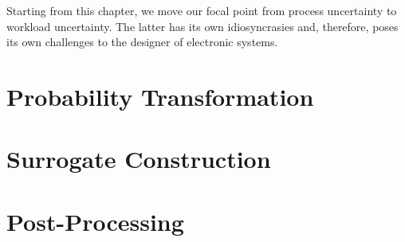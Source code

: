 Starting from this chapter, we move our focal point from process uncertainty to
workload uncertainty. The latter has its own idiosyncrasies and, therefore,
poses its own challenges to the designer of electronic systems.

\section{\introductiontitle}

\section{\motivationtitle}

\section{\problemtitle}

\section{\pasttitle}

\section{\solutiontitle}

\section{Probability Transformation}

\section{Surrogate Construction}

\section{Post-Processing}

\section{\applicationtitle}

\section{\resultstitle}

\section{\conclusiontitle}

